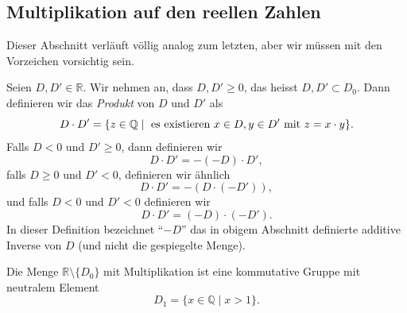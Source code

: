 \documentclass[../main.tex]{subfiles}
\begin{document}
\subsection*{Multiplikation auf den reellen Zahlen}
Dieser Abschnitt verläuft völlig analog zum letzten,
aber wir müssen mit den Vorzeichen vorsichtig sein.

\begin{definition}
Seien
$D ,D' \in \mathbb R$. Wir nehmen an, dass $D, D' \geq 0$,
das heisst $D, D' \subset D_{0}$. Dann definieren wir das \emph{Produkt}
von $D$ und $D'$ als
\[D \cdot D' = \{z \in \mathbb Q \mid \textup{ es existieren } x \in D,
  y \in D' \textup{ mit } z = x \cdot y\}.\]
Falls $D < 0$ und $D' \geq 0$, dann definieren wir
\[D \cdot D' = -(-D) \cdot D',\]
falls $D \geq 0$ und $D' < 0$, definieren wir ähnlich
\[D \cdot D' = -(D \cdot (-D')),\]
und falls $D < 0$ und $D' < 0$ definieren wir
\[D \cdot D' = (-D) \cdot (-D').\]
In dieser Definition bezeichnet ``$-D$'' das in obigem Abschnitt
definierte additive Inverse von $D$ (und nicht die gespiegelte Menge).
\end{definition}

\begin{manuallemma}{2}
  Die Menge $\mathbb R \setminus \{D_{0}\}$ mit Multiplikation ist eine
  kommutative Gruppe mit neutralem Element
  \[D_{1} = \{x \in \mathbb Q \mid x > 1\}.\]
\end{manuallemma}
\end{document}
